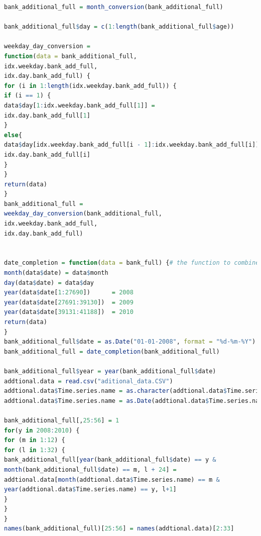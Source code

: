 \documentclass[12pt, a4paper, bibliography=totoc, english]{scrartcl}
\begin{document}
\begin{lstlisting}[language = R]
bank_additional_full = month_conversion(bank_additional_full)

bank_additional_full$day = c(1:length(bank_additional_full$age))

weekday_day_conversion =
function(data = bank_additional_full,
idx.weekday.bank_add_full,
idx.day.bank_add_full) {
for (i in 1:length(idx.weekday.bank_add_full)) {
if (i == 1) {
data$day[1:idx.weekday.bank_add_full[1]] =
idx.day.bank_add_full[1]
}
else{
data$day[idx.weekday.bank_add_full[i - 1]:idx.weekday.bank_add_full[i]] =
idx.day.bank_add_full[i]
}
}
return(data)
}
bank_additional_full =
weekday_day_conversion(bank_additional_full,
idx.weekday.bank_add_full,
idx.day.bank_add_full)


date_completion = function(data = bank_full) {# the function to combine all create day, month and year together
month(data$date) = data$month
day(data$date) = data$day
year(data$date[1:27690])      = 2008
year(data$date[27691:39130])  = 2009
year(data$date[39131:41188])  = 2010
return(data)
}
bank_additional_full$date = as.Date("01-01-2008", format = "%d-%m-%Y")
bank_additional_full = date_completion(bank_additional_full)

bank_additional_full$year = year(bank_additional_full$date)
addtional.data = read.csv("aditional_data.CSV")
addtional.data$Time.series.name = as.character(addtional.data$Time.series.name)
addtional.data$Time.series.name = as.Date(addtional.data$Time.series.name,format = "%d-%m-%Y")

bank_additional_full[,25:56] = 1
for(y in 2008:2010) {
for (m in 1:12) {
for (l in 1:32) {
bank_additional_full[year(bank_additional_full$date) == y &
month(bank_additional_full$date) == m, l + 24] =
addtional.data[month(addtional.data$Time.series.name) == m &
year(addtional.data$Time.series.name) == y, l+1]
}
} 
}
names(bank_additional_full)[25:56] = names(addtional.data)[2:33]
\end{lstlisting}
\end{document}
